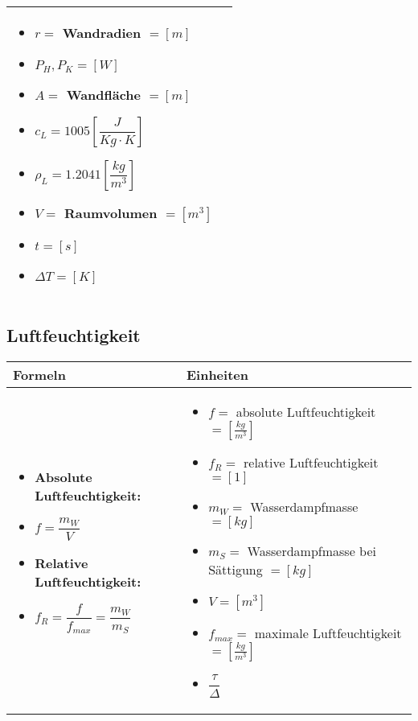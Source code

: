 \begin{tabular}{ | m{10cm} | m{8cm}  | }
\begin{itemize}
			\item $r=$ Wandradien $=[m]$
			\item $P_{H},P_{K}=[W]$
			\item $A=$ Wandfläche $=[m]$
			\item $c_{L}=1005[\dfrac{J}{Kg\cdot K}]$
			\item $\rho_{L}=1.2041[\dfrac{kg}{m^{3}}]$
			\item $V=$ Raumvolumen $=[m^{3}]$
			\item $t=[s]$
			\item $\Delta T=[K]$
		\end{itemize}
		\\ \hline
	\end{tabular}

\subsection{Luftfeuchtigkeit}		%
	\begin{center}
		\begin{tabular}{ | m{6cm} | m{12cm}  | }
			\hline
			Formeln & Einheiten \\ \hline
			\hline
			\begin{itemize}
				\item \textbf{Absolute Luftfeuchtigkeit:}
				\item $f=\dfrac{m_W}{V}$
				
				\item \textbf{Relative Luftfeuchtigkeit:}
				\item $f_R=\dfrac{f}{f_{max}}=\dfrac{m_W}{m_S}$
			
			\end{itemize}
			&
			\begin{itemize}
				\item $f=$ absolute Luftfeuchtigkeit $=[\frac{kg}{m^3}]$
				\item $f_R=$ relative Luftfeuchtigkeit $=[1]$
				\item $m_W=$ Wasserdampfmasse $=[kg]$
				\item $m_S=$ Wasserdampfmasse bei Sättigung $=[kg]$
				\item $V=[m^3]$
				\item $f_{max}=$ maximale Luftfeuchtigkeit $=[\frac{kg}{m^3}]$
				\item $\dfrac{\tau}{\Delta}$
			
			\end{itemize}
			\\ \hline
		\end{tabular}
	\end{center}
\newpage

